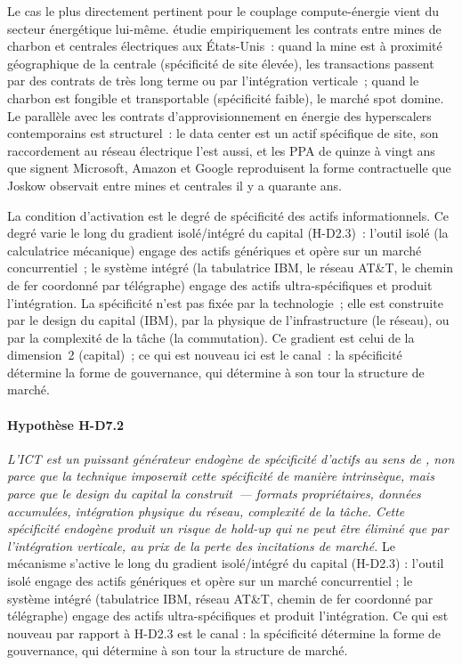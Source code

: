 Le cas le plus directement pertinent pour le couplage compute-énergie vient du secteur énergétique lui-même. \textcite{joskow_contract_1987} étudie empiriquement les contrats entre mines de charbon et centrales électriques aux États-Unis~: quand la mine est à proximité géographique de la centrale (spécificité de site élevée), les transactions passent par des contrats de très long terme ou par l'intégration verticale~; quand le charbon est fongible et transportable (spécificité faible), le marché spot domine. Le parallèle avec les contrats d'approvisionnement en énergie des hyperscalers contemporains est structurel~: le data center est un actif spécifique de site, son raccordement au réseau électrique l'est aussi, et les PPA de quinze à vingt ans que signent Microsoft, Amazon et Google reproduisent la forme contractuelle que Joskow observait entre mines et centrales il y a quarante ans.

La condition d'activation est le degré de spécificité des actifs informationnels. Ce degré varie le long du gradient isolé/intégré du capital (H-D2.3)~: l'outil isolé (la calculatrice mécanique) engage des actifs génériques et opère sur un marché concurrentiel~; le système intégré (la tabulatrice IBM, le réseau AT\&T, le chemin de fer coordonné par télégraphe) engage des actifs ultra-spécifiques et produit l'intégration. La spécificité n'est pas fixée par la technologie~; elle est construite par le design du capital (IBM), par la physique de l'infrastructure (le réseau), ou par la complexité de la tâche (la commutation). Ce gradient est celui de la dimension~2 (capital)~; ce qui est nouveau ici est le canal~: la spécificité détermine la forme de gouvernance, qui détermine à son tour la structure de marché.


\paragraph{Hypothèse H-D7.2} \emph{L'ICT est un puissant générateur endogène de spécificité d'actifs au sens de \textcite{williamson_economic_1985}, non parce que la technique imposerait cette spécificité de manière intrinsèque, mais parce que le design du capital la \emph{construit}~--- formats propriétaires, données accumulées, intégration physique du réseau, complexité de la tâche. Cette spécificité endogène produit un risque de hold-up qui ne peut être éliminé que par l'intégration verticale, au prix de la perte des incitations de marché.} Le mécanisme s'active le long du gradient isolé/intégré du capital (H-D2.3) : l'outil isolé engage des actifs génériques et opère sur un marché concurrentiel ; le système intégré (tabulatrice IBM, réseau AT\&T, chemin de fer coordonné par télégraphe) engage des actifs ultra-spécifiques et produit l'intégration. Ce qui est nouveau par rapport à H-D2.3 est le canal : la spécificité détermine la forme de gouvernance, qui détermine à son tour la structure de marché.

